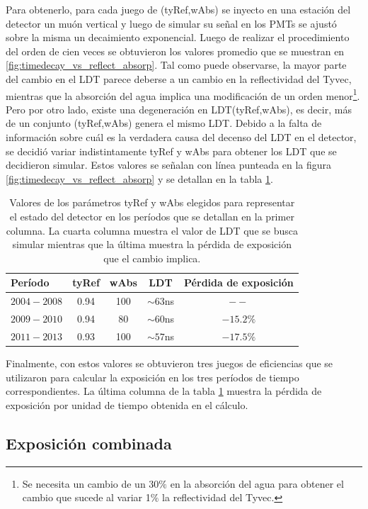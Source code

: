 	Para obtenerlo, para cada juego de (tyRef,wAbs) se inyecto en una estación del detector un muón vertical y luego de simular su señal en los PMTs se ajustó sobre la misma un decaimiento exponencial. Luego de realizar el procedimiento del orden de cien veces se obtuvieron los valores promedio que se muestran en \ref{fig:timedecay_vs_reflect_absorp}.
	Tal como puede observarse, la mayor parte del cambio en el LDT parece deberse a un cambio en la reflectividad del Tyvec, mientras que la absorción del agua implica una modificaci\'on de un orden menor\footnote{Se necesita un cambio de un $30\%$ en la absorción del agua para obtener el cambio que sucede al variar 1$\%$ la reflectividad del Tyvec.}.
	Pero por otro lado, existe una degeneración en LDT(tyRef,wAbs), es decir, más de un conjunto (tyRef,wAbs) genera el mismo LDT.
	Debido a la falta de información sobre cuál es la verdadera causa del decenso del LDT en el detector, se decidió variar indistintamente tyRef y wAbs para obtener los LDT que se decidieron simular.
	Estos valores se señalan con línea punteada en la figura \ref{fig:timedecay_vs_reflect_absorp} y se detallan en la tabla \ref{tab:ageingEffect}.
	\begin{table}[ht!]
	\centering
	\renewcommand{\arraystretch}{1.4}
	 \begin{tabular}{|l|ccc|c|}
				\hline
				Período       & tyRef & wAbs & LDT        &    Pérdida de exposición \\
				\hline
				$2004 - 2008$ & 0.94  & 100  & $\sim63$ns &    $--$ \\
				$2009 - 2010$ & 0.94  & 80   & $\sim60$ns &    $-15.2\%$\\
				$2011 - 2013$ & 0.93  & 100  & $\sim57$ns &    $-17.5\%$\\
				\hline
	 \end{tabular}
	 \caption{Valores de los parámetros tyRef y wAbs elegidos para representar el estado del detector en los períodos que se detallan en la primer columna. La cuarta columna muestra el valor de LDT que se busca simular mientras que la última muestra la pérdida de exposición que el cambio implica.}
	 \label{tab:ageingEffect}
	\end{table}
	Finalmente, con estos valores se obtuvieron tres juegos de eficiencias que se utilizaron para calcular la exposición en los tres períodos de tiempo correspondientes.
	La última columna de la tabla \ref{tab:ageingEffect} muestra la pérdida de exposición por unidad de tiempo obtenida en el cálculo.
	
	\subsection{Exposici\'on combinada}
	
